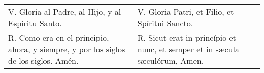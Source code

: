 \documentclass[../devocionario.tex]{subfiles}
\begin{document}
    \begin{longtable} { p{} p{} }
        V. Gloria al Padre, al Hijo, y al Espíritu Santo. &
        V. Gloria Patri, et Filio, et Spíritui Sancto.\\
        
        R. Como era en el principio, ahora, y siempre, y por los siglos de los siglos. Amén. &
        R. Sicut erat in princípio et nunc, et semper et in sæcula sæculórum, Amen.
    \end{longtable}
\end{document}
